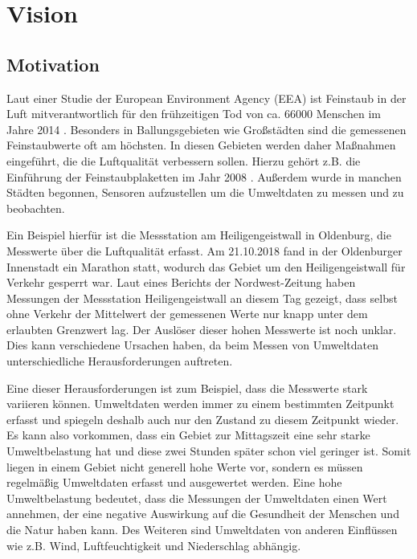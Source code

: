 \chapter{Vision}
\label{cha:Vision}

\section{Motivation}
\label{sec:Motivation}
Laut einer Studie der European Environment Agency (EEA) ist Feinstaub in der Luft mitverantwortlich für den frühzeitigen Tod von ca. 66000 Menschen im Jahre 2014 \cite{AirQualityReportEEA}. Besonders in Ballungsgebieten wie Großstädten sind die gemessenen Feinstaubwerte oft am höchsten. In diesen Gebieten werden daher Maßnahmen eingeführt, die die Luftqualität verbessern sollen. Hierzu gehört z.B. die Einführung der Feinstaubplaketten im Jahr 2008 \cite{Umweltplakette}. Außerdem wurde in manchen Städten begonnen, Sensoren aufzustellen um die Umweltdaten zu messen und zu beobachten.

Ein Beispiel hierfür ist die Messstation am Heiligengeistwall in Oldenburg, die Messwerte über die Luftqualität erfasst. Am 21.10.2018 fand in der Oldenburger Innenstadt ein Marathon statt, wodurch das Gebiet um den Heiligengeistwall für Verkehr gesperrt war. Laut eines Berichts der Nordwest-Zeitung \cite{NWZMarathonOldenburg} haben Messungen der Messstation Heiligengeistwall an diesem Tag gezeigt, dass selbst ohne Verkehr der Mittelwert der gemessenen Werte nur knapp unter dem erlaubten Grenzwert lag. Der Auslöser dieser hohen Messwerte ist noch unklar. Dies kann verschiedene Ursachen haben, da beim Messen von Umweltdaten unterschiedliche Herausforderungen auftreten.

Eine dieser Herausforderungen ist zum Beispiel, dass die Messwerte stark variieren können. Umweltdaten werden immer zu einem bestimmten Zeitpunkt erfasst und spiegeln deshalb auch nur den Zustand zu diesem Zeitpunkt wieder. Es kann also vorkommen, dass ein Gebiet zur Mittagszeit eine sehr starke Umweltbelastung hat und diese zwei Stunden später schon viel geringer ist. Somit liegen in einem Gebiet nicht generell hohe Werte vor, sondern es müssen regelmäßig Umweltdaten erfasst und ausgewertet werden. Eine hohe Umweltbelastung bedeutet, dass die Messungen der Umweltdaten einen Wert annehmen, der eine negative Auswirkung auf die Gesundheit der Menschen und die Natur haben kann. Des Weiteren sind Umweltdaten von anderen Einflüssen wie z.B. Wind, Luftfeuchtigkeit und Niederschlag abhängig.

